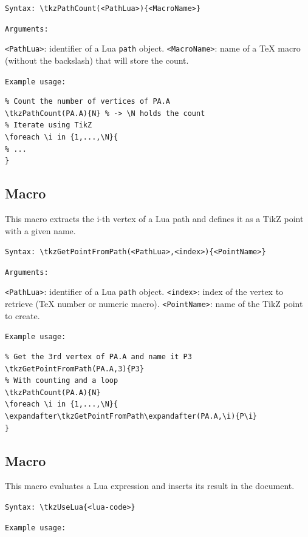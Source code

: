 \texttt{Syntax: }\verb|\tkzPathCount(<PathLua>){<MacroName>}|

\texttt{Arguments: }

\verb|<PathLua>|: identifier of a Lua \verb|path| object.
\verb|<MacroName>|: name of a TeX macro (without the backslash) that will store the count.


\texttt{Example usage: }

\begin{mybox}
\begin{verbatim}
% Count the number of vertices of PA.A
\tkzPathCount(PA.A){N} % -> \N holds the count
% Iterate using TikZ
\foreach \i in {1,...,\N}{
% ...
}
\end{verbatim}
\end{mybox}
\subsection{Macro }
This macro extracts the i-th vertex of a Lua path and defines it as a TikZ point with a given name.

\texttt{Syntax: }\verb|\tkzGetPointFromPath(<PathLua>,<index>){<PointName>}|

\texttt{Arguments: }

\verb|<PathLua>|: identifier of a Lua \verb|path| object.
\verb|<index>|: index of the vertex to retrieve (TeX number or numeric macro).
\verb|<PointName>|: name of the TikZ point to create.
\medskip


\texttt{Example usage:}

\begin{mybox}
\begin{verbatim}
% Get the 3rd vertex of PA.A and name it P3
\tkzGetPointFromPath(PA.A,3){P3}
% With counting and a loop
\tkzPathCount(PA.A){N}
\foreach \i in {1,...,\N}{
\expandafter\tkzGetPointFromPath\expandafter(PA.A,\i){P\i}
}
\end{verbatim}
\end{mybox}

\subsection{Macro }

This macro evaluates a Lua expression and inserts its result in the document.


\texttt{Syntax: }\verb|\tkzUseLua{<lua-code>}|

\texttt{Example usage: }


